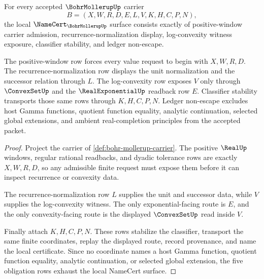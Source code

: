 \begin{theorem}
\label{thm:bohr-mollerup-namecert-obligations}
For every accepted $\BohrMollerupUp$ carrier
$$
B=(X,W,R,D,E,L,V,K,H,C,P,N),
$$
the local $\NameCert_{\BohrMollerupUp}$ surface consists exactly of positive-window carrier admission, recurrence-normalization display, log-convexity witness exposure, classifier stability, and ledger non-escape.

The positive-window row forces every value request to begin with $X,W,R,D$. The recurrence-normalization row displays the unit normalization and the successor relation through $L$. The log-convexity row exposes $V$ only through $\ConvexSetUp$ and the $\RealExponentialUp$ readback row $E$. Classifier stability transports those same rows through $K,H,C,P,N$. Ledger non-escape excludes host Gamma functions, quotient function equality, analytic continuation, selected global extensions, and ambient real-completion principles from the accepted packet.
\end{theorem}
\begin{proof}
Project the carrier of \autoref{def:bohr-mollerup-carrier}. The positive $\RealUp$ windows, regular rational readbacks, and dyadic tolerance rows are exactly $X,W,R,D$, so any admissible finite request must expose them before it can inspect recurrence or convexity data.

The recurrence-normalization row $L$ supplies the unit and successor data, while $V$ supplies the log-convexity witness. The only exponential-facing route is $E$, and the only convexity-facing route is the displayed $\ConvexSetUp$ read inside $V$.

Finally attach $K,H,C,P,N$. These rows stabilize the classifier, transport the same finite coordinates, replay the displayed route, record provenance, and name the local certificate. Since no coordinate names a host Gamma function, quotient function equality, analytic continuation, or selected global extension, the five obligation rows exhaust the local NameCert surface.
\end{proof}


